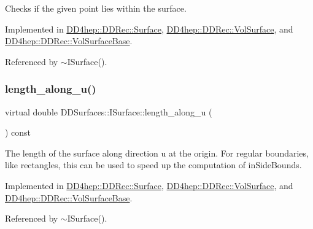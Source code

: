 Checks if the given point lies within the surface. 



Implemented in \hyperlink{class_d_d4hep_1_1_d_d_rec_1_1_surface_a80a84ee1e6030a6df90f9cf6da06f041}{D\+D4hep\+::\+D\+D\+Rec\+::\+Surface}, \hyperlink{class_d_d4hep_1_1_d_d_rec_1_1_vol_surface_abb5047e09cf8ccb538b3f97766321c9e}{D\+D4hep\+::\+D\+D\+Rec\+::\+Vol\+Surface}, and \hyperlink{class_d_d4hep_1_1_d_d_rec_1_1_vol_surface_base_a19dfde80d6e3d0dbe07dc3547dc20925}{D\+D4hep\+::\+D\+D\+Rec\+::\+Vol\+Surface\+Base}.



Referenced by $\sim$\+I\+Surface().

\hypertarget{class_d_d_surfaces_1_1_i_surface_a0060710912d3447e296a8e0875690cc9}{}\label{class_d_d_surfaces_1_1_i_surface_a0060710912d3447e296a8e0875690cc9} 
\subsubsection{\texorpdfstring{length\+\_\+along\+\_\+u()}{length\_along\_u()}}
{\footnotesize\ttfamily virtual double D\+D\+Surfaces\+::\+I\+Surface\+::length\+\_\+along\+\_\+u (\begin{DoxyParamCaption}{ }\end{DoxyParamCaption}) const\hspace{0.3cm}{\ttfamily [pure virtual]}}

The length of the surface along direction u at the origin. For \textquotesingle{}regular\textquotesingle{} boundaries, like rectangles, this can be used to speed up the computation of in\+Side\+Bounds. 

Implemented in \hyperlink{class_d_d4hep_1_1_d_d_rec_1_1_surface_afd98a91243f48c24fa45b3e812785401}{D\+D4hep\+::\+D\+D\+Rec\+::\+Surface}, \hyperlink{class_d_d4hep_1_1_d_d_rec_1_1_vol_surface_ad36f7614fbe777044e50e5f5fa5997de}{D\+D4hep\+::\+D\+D\+Rec\+::\+Vol\+Surface}, and \hyperlink{class_d_d4hep_1_1_d_d_rec_1_1_vol_surface_base_aab10f0dd7b5c8e928177bec4caf337c1}{D\+D4hep\+::\+D\+D\+Rec\+::\+Vol\+Surface\+Base}.



Referenced by $\sim$\+I\+Surface().

\hypertarget{class_d_d_surfaces_1_1_i_surface_a9a4682bfa68557d53cfd319cfa54148d}{}\label{class_d_d_surfaces_1_1_i_surface_a9a4682bfa68557d53cfd319cfa54148d} 
